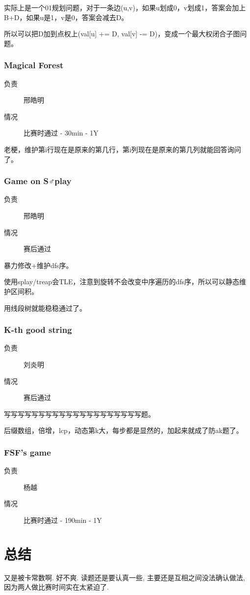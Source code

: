 \documentclass[a4paper, 11pt, nofonts, nocap, fancyhdr]{ctexart}
\newcommand{\problem}[1]{\subsubsection{#1}}
\begin{document}
实际上是一个01规划问题，对于一条边(u,v)，如果u划成0，v划成1，答案会加上B+D，如果u是1，v是0，答案会减去D。

所以可以把D加到点权上(val[u] += D, val[v] -= D)，变成一个最大权闭合子图问题。

\problem{Magical Forest}

\begin{description}
\item[负责] 邢皓明
\item[情况] 比赛时通过 - 30min - 1Y
\end{description}

老梗，维护第i行现在是原来的第几行，第i列现在是原来的第几列就能回答询问了。

\problem{Game on S♂play}

\begin{description}
\item[负责] 邢皓明
\item[情况] 赛后通过
\end{description}

暴力修改+维护dfs序。

使用splay/treap会TLE，注意到旋转不会改变中序遍历的dfs序，所以可以静态维护区间积。

用线段树就能稳稳通过了。

\problem{K-th good string}

\begin{description}
\item[负责] 刘炎明
\item[情况] 赛后通过
\end{description}

写写写写写写写写写写写写写写写写写写写写题。

后缀数组，倍增，lcp，动态第k大，每步都是显然的，加起来就成了防ak题了。

\problem{FSF’s game}

\begin{description}
\item[负责] 杨越
\item[情况] 比赛时通过 - 190min - 1Y
\end{description}


\section{总结}

又是被卡常数啊. 好不爽. 读题还是要认真一些, 主要还是互相之间没法确认做法, 因为两人做比赛时间实在太紧迫了.
\end{document}
